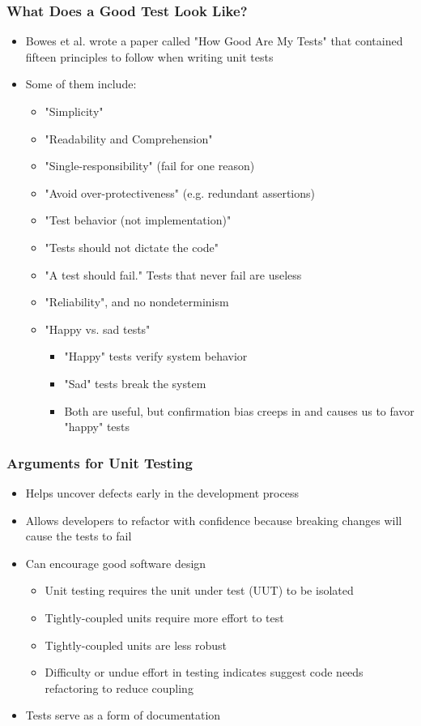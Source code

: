 \documentclass{beamer}
\begin{document}
\begin{frame}
\frametitle{What Does a Good Test Look Like?}
\begin{itemize}
	\item Bowes et al.\cite{howGoodAreMyTests} wrote a paper called "How Good Are My Tests" that contained fifteen principles to follow when writing unit tests
	\item Some of them include:
	\begin{itemize}
		\item "Simplicity"
		\item "Readability and Comprehension"
		\item "Single-responsibility" (fail for one reason)
		\item "Avoid over-protectiveness" (e.g. redundant assertions)
		\item "Test behavior (not implementation)"
		\item "Tests should not dictate the code"
		\item "A test should fail." Tests that never fail are useless
		\item "Reliability", and no nondeterminism
		\item "Happy vs. sad tests"
		\begin{itemize}
			\item "Happy" tests verify system behavior
			\item "Sad" tests break the system
			\item Both are useful, but confirmation bias creeps in and causes us to favor "happy" tests
		\end{itemize}
		
	\end{itemize}
\end{itemize}
\end{frame}

\begin{frame}
\frametitle{Arguments for Unit Testing}
\begin{itemize}
	\item Helps uncover defects early in the development process
	\item Allows developers to refactor with confidence because breaking changes will cause the tests to fail
	\item Can encourage good software design
	\begin{itemize}
		\item Unit testing requires the unit under test (UUT) to be isolated
		\item Tightly-coupled units require more effort to test
		\item Tightly-coupled units are less robust
		\item Difficulty or undue effort in testing indicates suggest code needs refactoring to reduce coupling
	\end{itemize}
	\item Tests serve as a form of documentation
\end{itemize}
\end{frame}
\end{document}

